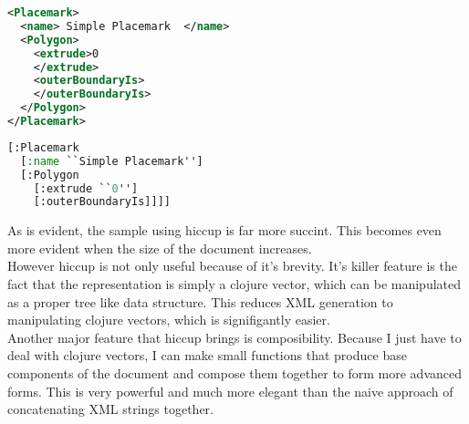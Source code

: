 \begin{lstlisting}[language=XML,caption= A simple placemark in raw KML]
<Placemark>
  <name> Simple Placemark  </name>
  <Polygon>
    <extrude>0
    </extrude>
    <outerBoundaryIs>
    </outerBoundaryIs>
  </Polygon>
</Placemark>
\end{lstlisting}

\begin{lstlisting}[language=Lisp, caption= The equivalent placemark with hiccup. Notice the brevity and lack of repetition]
[:Placemark
  [:name ``Simple Placemark'']
  [:Polygon
    [:extrude ``0'']
    [:outerBoundaryIs]]]]
\end{lstlisting}

As is evident, the sample using hiccup is far more succint. This becomes even more evident when the size of the document increases. \\

However hiccup is not only useful because of it's brevity. It's killer feature is the fact that the representation is simply a clojure vector, which can be manipulated as a proper tree like data structure. This reduces XML generation to manipulating clojure vectors, which is signifigantly easier.\\

Another major feature that hiccup brings is composibility. Because I just have to deal with clojure vectors, I can make small functions that produce base components of the document and compose them together to form more advanced forms. This is very powerful and much more elegant than the naive approach of concatenating XML strings together. \\
